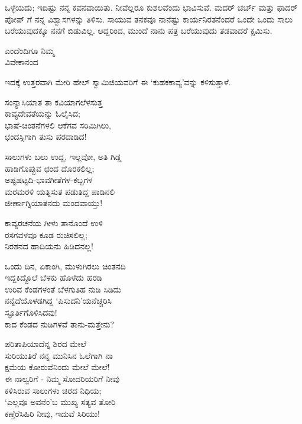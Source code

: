 ಒಳ್ಳೆಯದು; ಇದಿಷ್ಟು ನನ್ನ ಕವನವಾಯಿತು. ನೀವೆಲ್ಲರೂ ಕುಶಲವೆಂದು ಭಾವಿಸುವೆ. ಮದರ್ ಚರ್ಚ್ ಮತ್ತು ಫಾದರ್ ಪೋಪ್ ಗೆ ನನ್ನ ವಿಶ್ವಾಸಗಳನ್ನು ತಿಳಿಸು. ಸಾಯುವ ತನಕವೂ ನಾನೆಷ್ಟು ಕಾರ್ಯನಿರತನೆಂದರೆ ಒಂದೇ ಒಂದು ಸಾಲು ಬರೆಯುವುದಕ್ಕೂ ನನಗೆ ಬಿಡುವಿಲ್ಲ. ಆದ್ದರಿಂದ, ಮುಂದೆ ನಾನು ಪತ್ರ ಬರೆಯುವುದು ತಡವಾದರೆ ಕ್ಷಮಿಸು.

\begin{flushright}
ಎಂದೆಂದಿಗೂ ನಿಮ್ಮ\\ವಿವೇಕಾನಂದ
\end{flushright}

ಇದಕ್ಕೆ ಉತ್ತರವಾಗಿ ಮೇರಿ ಹೇಲ್ ಸ್ವಾಮಿಜಿಯವರಿಗೆ ಈ ‘ಕುಹಕಕಾವ್ಯ’ವನ್ನು ಕಳಿಸುತ್ತಾಳೆ.

\begin{myquote}
ಸಂನ್ಯಾಸಿಯಾತ ತಾ ಕವಿಯಾಗಲೆಳಸುತ್ತ\\ಕಾವ್ಯದೇವತೆಯನ್ನು ಓಲೈಸಿದ;\\ಭಾಷೆ-ಚಿಂತನೆಗಳಲಿ ಆಕೆಗವ ಸರಿಮಿಗಿಲು,\\ಛಂದಸ್ಸಿಗಾಗಿ ತುಸು ಪರದಾಡಿದ!
\end{myquote}

\begin{myquote}
ಸಾಲುಗಳು ಬಲು ಉದ್ದ, ಇಲ್ಲವೋ, ಅತಿ ಗಿಡ್ಡ\\ಹಾಡಿಗೊಪ್ಪುವ ಛಂದ ದೊರಕಲಿಲ್ಲ;\\ಅಷ್ಟಷಟ್ಟದಿ-ಭಾವಗೀತೆಗಳ-ಕಬ್ಬಗಳ\\ಮರಮರಳಿ ಯತ್ನಿಸುತ ಪಡುತಿದ್ದ ಪಾಡಿನಲಿ\\ಜೀರ್ಣಾಗ್ನಿಯಾತನದು ಮಂದವಾಯ್ತು!
\end{myquote}

\begin{myquote}
ಕಾವ್ಯರಚನೆಯ ಗೀಳು ತಾನೊಂದೆ ಉಳಿ\\ರಸಗವಳವೂ ಕೂಡ ರುಚಿಸಲಿಲ್ಲ;\\ನಿರಶನದ ಹಾದಿಯನು ಹಿಡಿದನಲ್ಲ!
\end{myquote}

\begin{myquote}
ಒಂದು ದಿನ, ಏಕಾಂಗಿ, ಮುಳುಗಿರಲು ಚಿಂತನದಿ\\ಇದ್ದಕಿದ್ದೊಲೆ ಬೆಳಕು ಹೊಳೆದು ಹರಡಿ\\ಉರಿವ ಕೆಂಡಗಳಂತೆ ಬೆಳಗುತಿಹ ನುಡಿ ಸಿಡಿದು\\ನನ್ನೆದೆಯೊಳಡಗಿದ್ದ ‘ಪಿಸುದನಿ’ಯನೆಚ್ಚರಿಸಿ\\ಸ್ಫೂರ್ತಿಗೊಳಿಸಿದವು!\\ಕಾದ ಕೆಂಡದ ನುಡಿಗಳವೆ ತಾನು-ಮತ್ತೇನು?
\end{myquote}

\begin{myquote}
ಪರಿತಾಪಿಯಾದೆನ್ನ ಶಿರದ ಮೇಲೆ\\ಸುರಿಯುತಿರೆ ನನ್ನ ಮುನಿಸಿನ ಓಲೆಗಾಗಿ ನಾ\\ಕ್ಷಮೆಯ ಕೋರುವೆನಿಂದು ಮೇಲೆ ಮೇಲೆ!\\ಈ ನಾಲ್ವರಿಗೆ - ನಿಮ್ಮ ಸೋದರಿಯರಿಗೆ ನೀವು\\ಕಳಿಸಿರುವ ಸಾಲುಗಳು ಚಿರದ ನಿಧಿಯ;\\‘ಎಲ್ಲವೂ ಅವನೆಂ’ಬ ಮುಖ್ಯ ಸತ್ಯವ ತೋರಿ\\ಕಣ್ತೆರೆಸಿಹಿರಿ ನೀವು, ಇದುವೆ ಸಿರಿಯು!
\end{myquote}

